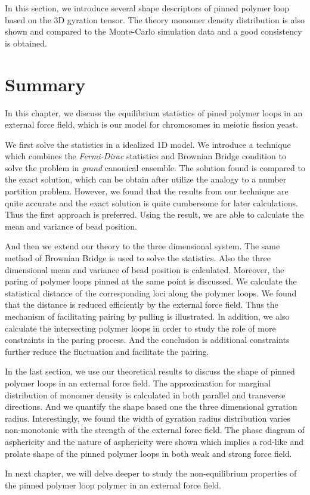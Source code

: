 In this section, we introduce several shape descriptors of pinned polymer loop based on the 3D gyration tensor. The theory monomer density distribution is also shown and compared to the Monte-Carlo simulation data and a good consistency is obtained. 



\section{Summary}
\label{sec:summary_chp3}

In this chapter, we discuss the equilibrium statistics of pined polymer loops in an external force field, which is our model for chromosomes in meiotic fission yeast. 

We first solve the statistics in a idealized 1D model. We introduce a technique which combines the \emph{Fermi-Dirac} statistics and Brownian Bridge condition to solve the problem in \emph{grand} canonical ensemble. The solution found is compared to the exact solution, which can be obtain after utilize the analogy to a number partition problem. However, we found that the results from our technique are quite accurate and the exact solution is quite cumbersome for later calculations. Thus the first approach is preferred. Using the result, we are able to calculate the mean and variance of bead position.  

And then we extend our theory to the three dimensional system. The same method of Brownian Bridge is used to solve the statistics. Also the three dimensional mean and variance of bead position is calculated. Moreover, the paring of polymer loops pinned at the same point is discussed. We calculate the statistical distance of the corresponding loci along the polymer loops. We found that the distance is reduced efficiently by the external force field. Thus the mechanism of facilitating pairing by pulling is illustrated. In addition, we also calculate the intersecting polymer loops in order to study the role of more constraints in the paring process. And the conclusion is additional constraints further reduce the fluctuation and facilitate the pairing. 

In the last section, we use our theoretical results to discuss the shape of pinned polymer loops in an external force field. The approximation for marginal distribution of monomer density is calculated in both parallel and transverse directions. And we quantify the shape based one the three dimensional gyration radius. Interestingly, we found the width of gyration radius distribution varies non-monotonic with the strength of the external force field. The phase diagram of asphericity and the nature of asphericity were shown which implies a rod-like and prolate shape of the pinned polymer loops in both weak and strong force field.

In next chapter, we will delve deeper to study the non-equilibrium properties of the pinned polymer loop polymer in an external force field. 
